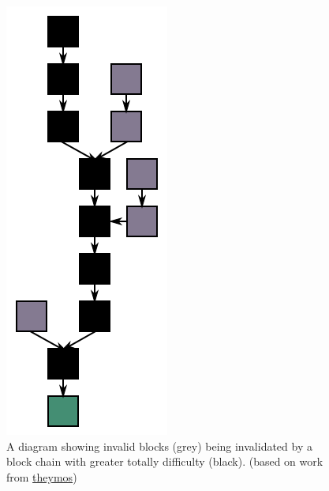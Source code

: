 \documentclass{beamer}
\begin{document}
\begin{frame}
\begin{figure}[h!]
    \includegraphics[angle=-90,width=0.8\columnwidth]{img/Blockchain}
    \caption{A diagram showing invalid blocks (grey) being invalidated by a block chain with greater totally difficulty (black). (based on work from \href{http://theymos.com/}{theymos})}
    \label{fig:blockchain}
\end{figure}
\end{frame}
\end{document}
